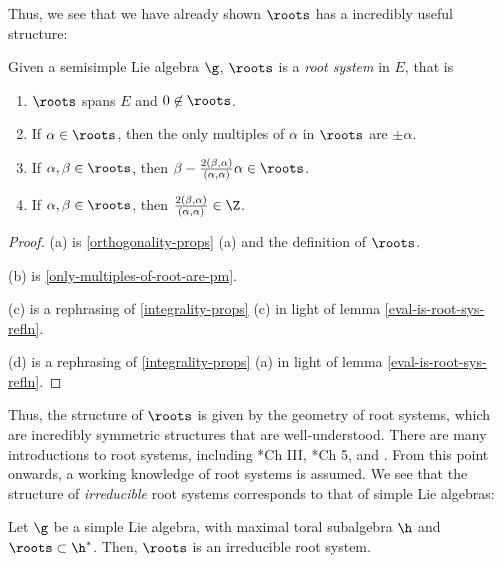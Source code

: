\documentclass[11pt,leqno,oneside]{amsart}
\numberwithin{thm}{section}
\begin{document}
Thus, we see that we have already shown \(\roots\) has a incredibly
useful structure:
\begin{prop}\label{roots-form-root-system}
  Given a semisimple Lie algebra \(\g\), \(\roots\) is a \emph{root
    system} in \(E\), that is
  \begin{enumerate}
  \item \(\roots\) spans \(E\) and \(0 \not \in \roots\).
  \item If \(\alpha \in \roots\), then the only multiples of
    \(\alpha\) in \(\roots\) are \(\pm \alpha\).
  \item If \(\alpha, \beta \in \roots\), then \(\beta -
    \frac{2(\beta,\alpha)}{(\alpha,\alpha)} \alpha \in \roots\).
  \item If \(\alpha, \beta \in \roots\), then
    \(\frac{2(\beta,\alpha)}{(\alpha, \alpha)} \in \Z\).
  \end{enumerate}
\end{prop}
\begin{proof}
  (a) is \ref{orthogonality-props} (a) and the definition of
  \(\roots\).

  (b) is \ref{only-multiples-of-root-are-pm}.

  (c) is a rephrasing of \ref{integrality-props} (c) in light of lemma
  \ref{eval-is-root-sys-refln}.

  (d) is a rephrasing of \ref{integrality-props} (a) in light of lemma
  \ref{eval-is-root-sys-refln}. 
\end{proof}
Thus, the structure of \(\roots\) is given by the geometry of root
systems, which are incredibly symmetric structures that are
well-understood. There are many introductions to root systems,
including \cite{humph}*{Ch III}, \cite{carter}*{Ch 5}, and
\cite{root-systems}. From this point onwards, a working knowledge of
root systems is assumed. We see that the structure of
\emph{irreducible} root systems corresponds to that of simple Lie
algebras:
\begin{prop}
  Let \(\g\) be a simple Lie algebra, with maximal toral subalgebra
  \(\h\) and \(\roots \subset \h^*\). Then, \(\roots\) is an
  irreducible root system.
\end{prop}
\end{document}
